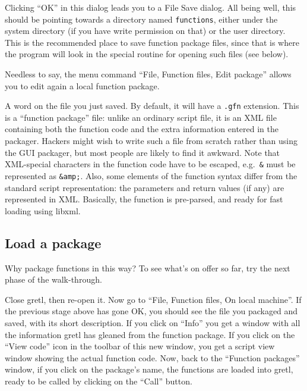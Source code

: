 Clicking ``OK'' in this dialog leads you to a File Save dialog.  All
being well, this should be pointing towards a directory named
\texttt{functions}, either under the  system directory (if
you have write permission on that) or the  user directory.
This is the recommended place to save function package files, since
that is where the program will look in the special routine for opening
such files (see below).

Needless to say, the menu command ``File, Function files, Edit package''
allows you to edit again a local function package.

\vspace{6pt}

A word on the file you just saved.  By default, it will have a
\texttt{.gfn} extension.  This is a ``function package'' file: unlike
an ordinary  script file, it is an XML file containing both
the function code and the extra information entered in the packager.
Hackers might wish to write such a file from scratch rather than using
the GUI packager, but most people are likely to find it awkward.  Note
that XML-special characters in the function code have to be escaped,
e.g.\ \texttt{\&} must be represented as \texttt{\&amp;}.  Also, some
elements of the function syntax differ from the standard script
representation: the parameters and return values (if any) are
represented in XML.  Basically, the function is pre-parsed, and ready
for fast loading using \textsf{libxml}.

\vspace{6pt}

\subsection{Load a package}

Why package functions in this way?  To see what's on offer so far, try
the next phase of the walk-through.

Close gretl, then re-open it.  Now go to ``File, Function files, On
local machine''. If the previous stage above has gone OK, you should
see the file you packaged and saved, with its short description.  If
you click on ``Info'' you get a window with all the information gretl
has gleaned from the function package.  If you click on the ``View
code'' icon in the toolbar of this new window, you get a script view
window showing the actual function code. Now, back to the ``Function
packages'' window, if you click on the package's name, the functions
are loaded into gretl, ready to be called by clicking on the ``Call''
button.

